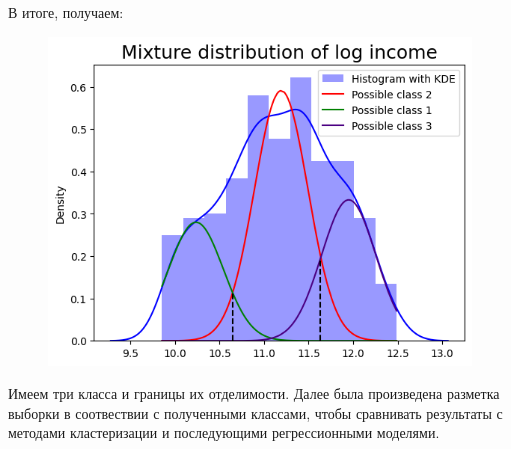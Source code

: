 \documentclass[12pt]{report}
\begin{document}
В итоге, получаем: 
\begin{figure}[H]
  \centering
  \includegraphics[scale=0.6]{./imgs/mix_logincome.png}
\end{figure}
Имеем три класса и границы их отделимости. Далее была произведена разметка выборки в соотвествии с полученными классами, чтобы сравнивать результаты с методами кластеризации и последующими регрессионными моделями.
\end{document}
